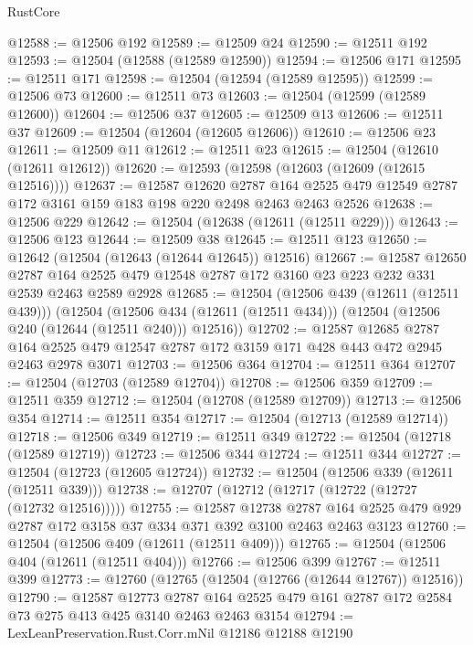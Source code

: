 \begin{lexlean}{RustCore}
\begin{coremodule}
@12588 := @12506 @192
@12589 := @12509 @24
@12590 := @12511 @192
@12593 := @12504 (@12588 (@12589 @12590))
@12594 := @12506 @171
@12595 := @12511 @171
@12598 := @12504 (@12594 (@12589 @12595))
@12599 := @12506 @73
@12600 := @12511 @73
@12603 := @12504 (@12599 (@12589 @12600))
@12604 := @12506 @37
@12605 := @12509 @13
@12606 := @12511 @37
@12609 := @12504 (@12604 (@12605 @12606))
@12610 := @12506 @23
@12611 := @12509 @11
@12612 := @12511 @23
@12615 := @12504 (@12610 (@12611 @12612))
@12620 := @12593 (@12598 (@12603 (@12609 (@12615 @12516))))
@12637 := @12587
    @12620
    @2787
    @164
    @2525
    @479
    @12549
    @2787
    @172
    @3161
    @159
    @183
    @198
    @220
    @2498
    @2463
    @2463
    @2526
@12638 := @12506 @229
@12642 := @12504 (@12638 (@12611 (@12511 @229)))
@12643 := @12506 @123
@12644 := @12509 @38
@12645 := @12511 @123
@12650 := @12642 (@12504 (@12643 (@12644 @12645)) @12516)
@12667 := @12587
    @12650
    @2787
    @164
    @2525
    @479
    @12548
    @2787
    @172
    @3160
    @23
    @223
    @232
    @331
    @2539
    @2463
    @2589
    @2928
@12685 := @12504
    (@12506 @439 (@12611 (@12511 @439)))
    (@12504
      (@12506 @434 (@12611 (@12511 @434)))
      (@12504 (@12506 @240 (@12644 (@12511 @240))) @12516))
@12702 := @12587
    @12685
    @2787
    @164
    @2525
    @479
    @12547
    @2787
    @172
    @3159
    @171
    @428
    @443
    @472
    @2945
    @2463
    @2978
    @3071
@12703 := @12506 @364
@12704 := @12511 @364
@12707 := @12504 (@12703 (@12589 @12704))
@12708 := @12506 @359
@12709 := @12511 @359
@12712 := @12504 (@12708 (@12589 @12709))
@12713 := @12506 @354
@12714 := @12511 @354
@12717 := @12504 (@12713 (@12589 @12714))
@12718 := @12506 @349
@12719 := @12511 @349
@12722 := @12504 (@12718 (@12589 @12719))
@12723 := @12506 @344
@12724 := @12511 @344
@12727 := @12504 (@12723 (@12605 @12724))
@12732 := @12504 (@12506 @339 (@12611 (@12511 @339)))
@12738 := @12707 (@12712 (@12717 (@12722 (@12727 (@12732 @12516)))))
@12755 := @12587
    @12738
    @2787
    @164
    @2525
    @479
    @929
    @2787
    @172
    @3158
    @37
    @334
    @371
    @392
    @3100
    @2463
    @2463
    @3123
@12760 := @12504 (@12506 @409 (@12611 (@12511 @409)))
@12765 := @12504 (@12506 @404 (@12611 (@12511 @404)))
@12766 := @12506 @399
@12767 := @12511 @399
@12773 := @12760 (@12765 (@12504 (@12766 (@12644 @12767)) @12516))
@12790 := @12587
    @12773
    @2787
    @164
    @2525
    @479
    @161
    @2787
    @172
    @2584
    @73
    @275
    @413
    @425
    @3140
    @2463
    @2463
    @3154
@12794 := LexLeanPreservation.Rust.Corr.mNil @12186 @12188 @12190

\end{coremodule}
\end{lexlean}
